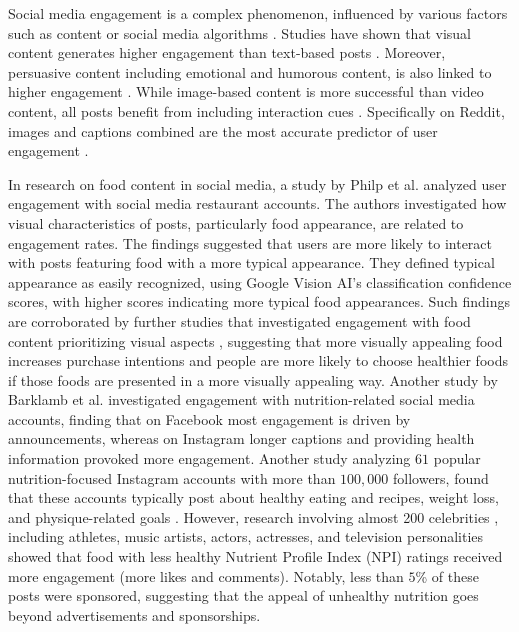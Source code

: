 Social media engagement is a complex phenomenon, influenced by various factors such as content or social media algorithms \cite{yan_evolution_2024}. 
Studies have shown that visual content generates higher engagement than text-based posts \cite{generator_examination_2024}.
Moreover, persuasive content including emotional and humorous content, is also linked to higher engagement \cite{lee_effect_2013}. 
While image-based content is more successful than video content, all posts benefit from including interaction cues \cite{moran_message_2019}. 
Specifically on Reddit, images and captions combined are the most accurate predictor of user engagement \cite{hessel_cats_2017}. 

In research on food content in social media, a study by Philp et al. \cite{philp_predicting_2022} analyzed user engagement with social media restaurant accounts. 
The authors investigated how visual characteristics of posts, particularly food appearance, are related to engagement rates.
The findings suggested that users are more likely to interact with posts featuring food with a more typical appearance.
They defined typical appearance as easily recognized, using Google Vision AI's classification confidence scores, with higher scores indicating more typical food appearances.
Such findings are corroborated by further studies that investigated engagement with food content prioritizing visual aspects \cite{lee_visual_2023, starke_nudging_2021}, suggesting that more visually appealing food increases purchase intentions and people are more likely to choose healthier foods if those foods are presented in a more visually appealing way.
Another study by Barklamb et al. \cite{barklamb_learning_2020} investigated engagement with nutrition-related social media accounts, finding that on Facebook most engagement is driven by announcements, whereas on Instagram longer captions and providing health information provoked more engagement.
Another study analyzing $61$ popular nutrition-focused Instagram accounts with more than $100,000$ followers, found that these accounts typically post about healthy eating and recipes, weight loss, and physique-related goals \cite{denniss_nutrition-related_2023}. %
However, research involving almost 200 celebrities \cite{turnwald_nutritional_2022}, including athletes, music artists, actors, actresses, and television personalities showed that
food with less healthy Nutrient Profile Index (NPI) ratings received more engagement (more likes and comments). 
Notably, less than $5$\% of these posts were sponsored, suggesting that the appeal of unhealthy nutrition goes beyond advertisements and sponsorships.


